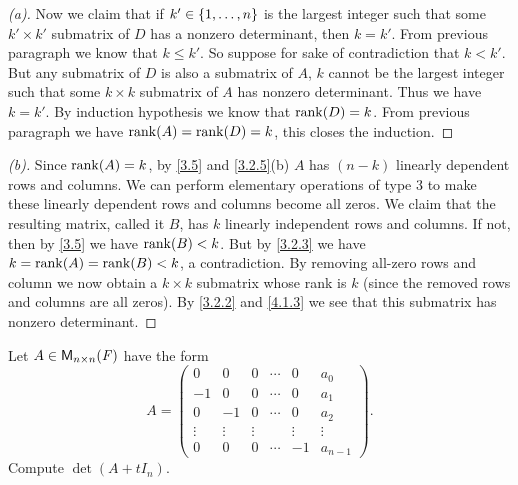 \begin{proof}[(a)]
  Now we claim that if \(k' \in \left\lbrace1, \dots, n\right\rbrace\) is the largest integer such that some \(k' \times k'\) submatrix of \(D\) has a nonzero determinant, then \(k = k'\).
  From previous paragraph we know that \(k \leq k'\).
  So suppose for sake of contradiction that \(k < k'\).
  But any submatrix of \(D\) is also a submatrix of \(A\), \(k\) cannot be the largest integer such that some \(k \times k\) submatrix of \(A\) has nonzero determinant.
  Thus we have \(k = k'\).
  By induction hypothesis we know that \(\rk{D} = k\).
  From previous paragraph we have \(\rk{A} = \rk{D} = k\), this closes the induction.
\end{proof}

\begin{proof}[(b)]
  Since \(\rk{A} = k\), by \cref{3.5} and \cref{3.2.5}(b) \(A\) has \((n - k)\) linearly dependent rows and columns.
  We can perform elementary operations of type 3 to make these linearly dependent rows and columns become all zeros.
  We claim that the resulting matrix, called it \(B\), has \(k\) linearly independent rows and columns.
  If not, then by \cref{3.5} we have \(\rk{B} < k\).
  But by \cref{3.2.3} we have \(k = \rk{A} = \rk{B} < k\), a contradiction.
  By removing all-zero rows and column we now obtain a \(k \times k\) submatrix whose rank is \(k\) (since the removed rows and columns are all zeros).
  By \cref{3.2.2} and \cref{4.1.3} we see that this submatrix has nonzero determinant.
\end{proof}

\begin{ex}\label{ex:4.2.24}
  Let \(A \in \ms[n][n][\F]\) have the form
  \[
    A = \begin{pmatrix}
      0      & 0      & 0      & \cdots & 0      & a_0       \\
      -1     & 0      & 0      & \cdots & 0      & a_1       \\
      0      & -1     & 0      & \cdots & 0      & a_2       \\
      \vdots & \vdots & \vdots &        & \vdots & \vdots    \\
      0      & 0      & 0      & \cdots & -1     & a_{n - 1}
    \end{pmatrix}.
  \]
  Compute \(\det(A + t I_n)\).
\end{ex}


